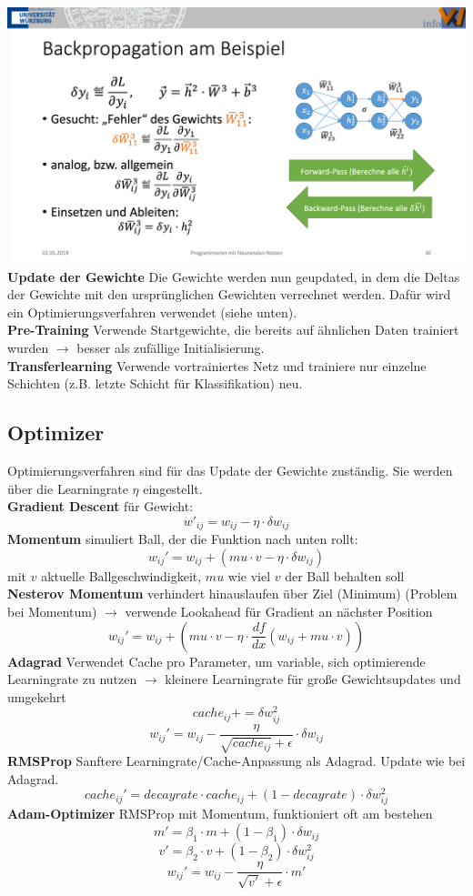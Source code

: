 \documentclass[12pt]{article}
\begin{document}
	\includegraphics[width=\linewidth]{figures/calculate-delta-weights.png}\\
	\textbf{Update der Gewichte} Die Gewichte werden nun geupdated, in dem die Deltas der Gewichte mit den ursprünglichen Gewichten verrechnet werden. Dafür wird ein Optimierungsverfahren verwendet (siehe unten).\\
	\textbf{Pre-Training} Verwende Startgewichte, die bereits auf ähnlichen Daten trainiert wurden $\rightarrow$ besser als zufällige Initialisierung.\\
	\textbf{Transferlearning} Verwende vortrainiertes Netz und trainiere nur einzelne Schichten (z.B. letzte Schicht für Klassifikation) neu.

	\subsection{Optimizer}
	Optimierungsverfahren sind für das Update der Gewichte zuständig. Sie werden über die Learningrate $\eta$ eingestellt.\\
	\textbf{Gradient Descent} für Gewicht:
	$$w'_{ij} = w_{ij} - \eta \cdot \delta w_{ij}$$
	\textbf{Momentum} simuliert Ball, der die Funktion nach unten rollt:
	$$w_{ij}' = w_{ij} + (mu \cdot v - \eta \cdot \delta w_{ij})$$
	mit $v$ aktuelle Ballgeschwindigkeit, $mu$ wie viel $v$ der Ball behalten soll\\
	\textbf{Nesterov Momentum} verhindert hinauslaufen über Ziel (Minimum) (Problem bei Momentum) $\rightarrow$ verwende Lookahead für Gradient an nächster Position
	$$w_{ij}' = w_{ij} + (mu \cdot v - \eta \cdot \frac{df}{dx}(w_{ij} + mu \cdot v))$$
	\textbf{Adagrad} Verwendet Cache pro Parameter, um variable, sich optimierende Learningrate zu nutzen $\rightarrow$ kleinere Learningrate für große Gewichtsupdates und umgekehrt
	$$cache_{ij} += \delta w_{ij}^2$$
	$$w_{ij}' = w_{ij} -\frac{\eta}{\sqrt{cache_{ij}} + \epsilon} \cdot \delta w_{ij}$$
	\textbf{RMSProp} Sanftere Learningrate/Cache-Anpassung als Adagrad. Update wie bei Adagrad.
	$$cache_{ij}' = decayrate \cdot cache_{ij} + (1 - decayrate) \cdot \delta w_{ij}^2$$
	\textbf{Adam-Optimizer} RMSProp mit Momentum, funktioniert oft am bestehen
	$$m' = \beta_1 \cdot m + (1 - \beta_1) \cdot \delta w_{ij}$$
	$$v' = \beta_2 \cdot v + (1 - \beta_2) \cdot \delta w_{ij}^2$$
	$$w_{ij}' = w_{ij} -\frac{\eta}{\sqrt{v'} + \epsilon} \cdot m'$$
\end{document}
